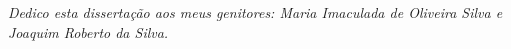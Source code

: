 \begin{dedicatoria}
   \vspace*{\fill}
   \centering
   \noindent\textit{Dedico esta disserta\c{c}\~ao aos meus genitores: Maria Imaculada de Oliveira Silva e Joaquim Roberto da Silva.} \vspace*{\fill}
\end{dedicatoria}
